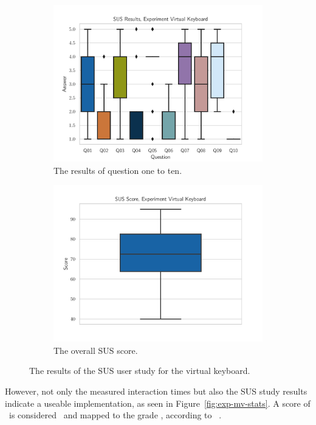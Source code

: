 \begin{figure}[H]
  \centering
  \begin{subfigure}{.48\textwidth}%
    \centering
    \includegraphics[width=\textwidth]{figures/evaluation/res_exp_vk.pdf}
    \caption{The results of question one to ten.}\label{fig:res-exp-vk}
  \end{subfigure}%
  \hspace{0.03\textwidth}%
  \begin{subfigure}{.48\textwidth}%
    \centering
    \includegraphics[width=\textwidth]{figures/evaluation/score_exp_vk.pdf}
    \caption{The overall \ac{SUS} score.}\label{fig:score-exp-vk}
  \end{subfigure}%
  \caption[User study results of the virtual keyboard experiment]{The results of the \ac{SUS} user study for the virtual keyboard.}\label{fig:exp-vk-stats}
\end{figure}

However, not only the measured interaction times but also the \ac{SUS} study results indicate a useable implementation, as seen in Figure~\ref{fig:exp-mv-stats}. A score of \evalExpVkSusScore\ is considered \evalExpVkSusAdj\ and mapped to the grade \evalExpVkSusGrade, according to \citeauthor{Bangor.2009}~\cite{Bangor.2009}.